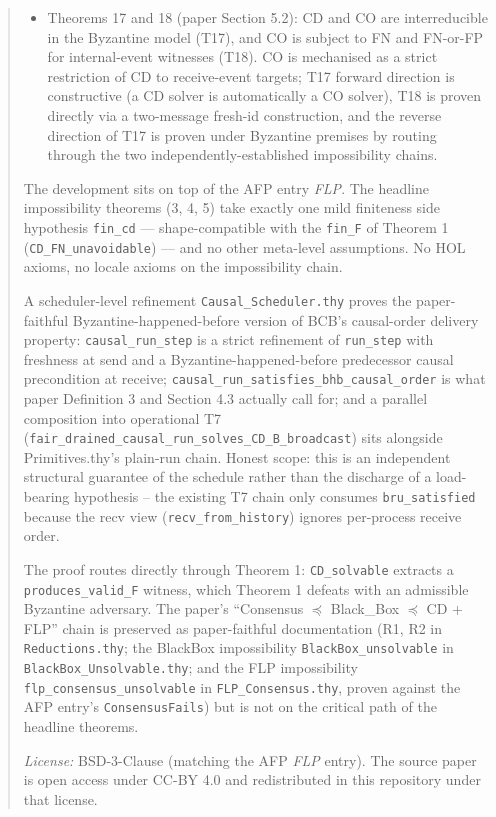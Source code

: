 \documentclass[11pt,a4paper]{article}
\begin{document}
\begin{abstract}
\begin{itemize}
        unsolvability and the abstract Consensus witness; in the
        crash-failure model, the asymmetry reverses (Consensus is
        unsolvable by FLP, CD is solvable via the
        \verb|cd_alg_with_recv| signature with $F := \mathit{recv}$
        whenever reports are faithful to the true execution).
  \item Theorems 17 and 18 (paper Section 5.2): CD and CO are
        interreducible in the Byzantine model (T17), and CO is
        subject to FN and FN-or-FP for internal-event witnesses
        (T18).  CO is mechanised as a strict restriction of CD to
        receive-event targets; T17 forward direction is
        constructive (a CD solver is automatically a CO solver),
        T18 is proven directly via a two-message fresh-id
        construction, and the reverse direction of T17 is proven
        under Byzantine premises by routing through the two
        independently-established impossibility chains.
\end{itemize}

The development sits on top of the AFP entry \emph{FLP}.  The
headline impossibility theorems (3, 4, 5) take exactly one mild
finiteness side hypothesis \verb|fin_cd| --- shape-compatible
with the \verb|fin_F| of Theorem 1 (\verb|CD_FN_unavoidable|) ---
and no other meta-level assumptions.  No HOL axioms, no locale
axioms on the impossibility chain.

A scheduler-level refinement \verb|Causal_Scheduler.thy| proves the
paper-faithful Byzantine-happened-before version of BCB's
causal-order delivery property: \verb|causal_run_step| is a strict
refinement of \verb|run_step| with freshness at send and a
Byzantine-happened-before predecessor causal precondition at
receive; \verb|causal_run_satisfies_bhb_causal_order| is what paper
Definition 3 and Section 4.3 actually call for; and a parallel
composition into operational T7
(\verb|fair_drained_causal_run_solves_CD_B_broadcast|) sits
alongside Primitives.thy's plain-run chain.  Honest scope: this is
an independent structural guarantee of the schedule rather than the
discharge of a load-bearing hypothesis -- the existing T7 chain only
consumes \verb|bru_satisfied| because the recv view
(\verb|recv_from_history|) ignores per-process receive order.

The proof routes directly through Theorem 1: \verb|CD_solvable|
extracts a \verb|produces_valid_F| witness, which Theorem 1
defeats with an admissible Byzantine adversary.  The paper's
``Consensus $\preceq$ Black\_Box $\preceq$ CD + FLP'' chain is
preserved as paper-faithful documentation (R1, R2 in
\verb|Reductions.thy|; the BlackBox impossibility
\verb|BlackBox_unsolvable| in \verb|BlackBox_Unsolvable.thy|; and
the FLP impossibility \verb|flp_consensus_unsolvable| in
\verb|FLP_Consensus.thy|, proven against the AFP entry's
\verb|ConsensusFails|) but is not on the critical path of the
headline theorems.

\medskip

\noindent\emph{License:} BSD-3-Clause (matching the AFP \emph{FLP}
entry).  The source paper is open access under CC-BY 4.0 and
redistributed in this repository under that license.
\end{abstract}
\end{document}
